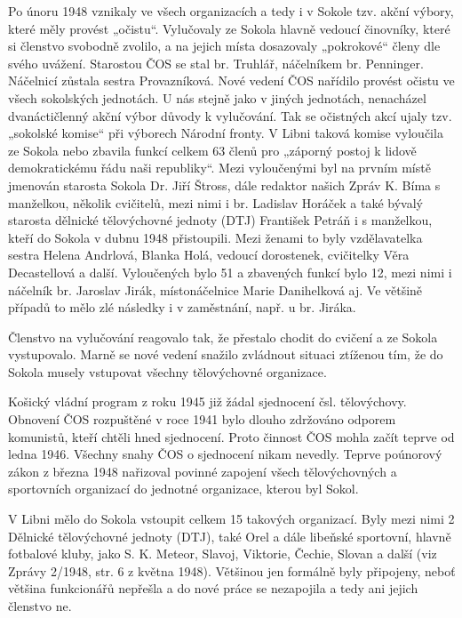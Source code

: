Po únoru 1948 vznikaly ve všech organizacích a tedy i v Sokole tzv.
akční výbory, které měly provést „očistu``. Vylučovaly ze Sokola hlavně
vedoucí činovníky, které si členstvo svobodně zvolilo, a na jejich místa
dosazovaly „pokrokové`` členy dle svého uvážení. Starostou ČOS se stal
br. Truhlář, náčelníkem br. Penninger. Náčelnicí zůstala sestra
Provazníková. Nové vedení ČOS nařídilo provést očistu ve všech
sokolských jednotách. U nás stejně jako v jiných jednotách, nenacházel
dvanáctičlenný akční výbor důvody k vylučování. Tak se očistných akcí
ujaly tzv. „sokolské komise`` při výborech Národní fronty. V Libni
taková komise vyloučila ze Sokola nebo zbavila funkcí celkem 63 členů
pro „záporný postoj k lidově demokratickému řádu naši republiky``. Mezi
vyloučenými byl na prvním místě jmenován starosta Sokola Dr. Jiří
Štross, dále redaktor našich Zpráv K. Bíma s manželkou, několik
cvičitelů, mezi nimi i br. Ladislav Horáček a také bývalý starosta
dělnické tělovýchovné jednoty (DTJ) František Petráň i s manželkou,
kteří do Sokola v dubnu 1948 přistoupili. Mezi ženami to byly
vzdělavatelka sestra Helena Andrlová, Blanka Holá, vedoucí dorostenek,
cvičitelky Věra Decastellová a další. Vyloučených bylo 51 a zbavených
funkcí bylo 12, mezi nimi i náčelník br. Jaroslav Jirák, místonáčelnice
Marie Danihelková aj. Ve většině případů to mělo zlé následky i v
zaměstnání, např. u br. Jiráka.

Členstvo na vylučování reagovalo tak, že přestalo chodit do cvičení a ze
Sokola vystupovalo. Marně se nové vedení snažilo zvládnout situaci
ztíženou tím, že do Sokola musely vstupovat všechny tělovýchovné
organizace.

Košický vládní program z roku 1945 již žádal sjednocení čsl.
tělovýchovy. Obnovení ČOS rozpuštěné v roce 1941 bylo dlouho zdržováno
odporem komunistů, kteří chtěli hned sjednocení. Proto činnost ČOS mohla
začít teprve od ledna 1946. Všechny snahy ČOS o sjednocení nikam
nevedly. Teprve poúnorový zákon z března 1948 nařizoval povinné zapojení
všech tělovýchovných a sportovních organizací do jednotné organizace,
kterou byl Sokol.

V Libni mělo do Sokola vstoupit celkem 15 takových organizací. Byly mezi
nimi 2 Dělnické tělovýchovné jednoty (DTJ), také Orel a dále libeňské
sportovní, hlavně fotbalové kluby, jako S. K. Meteor, Slavoj, Viktorie,
Čechie, Slovan a další (viz Zprávy 2/1948, str. 6 z května 1948).
Většinou jen formálně byly připojeny, neboť většina funkcionářů nepřešla
a do nové práce se nezapojila a tedy ani jejich členstvo ne.

